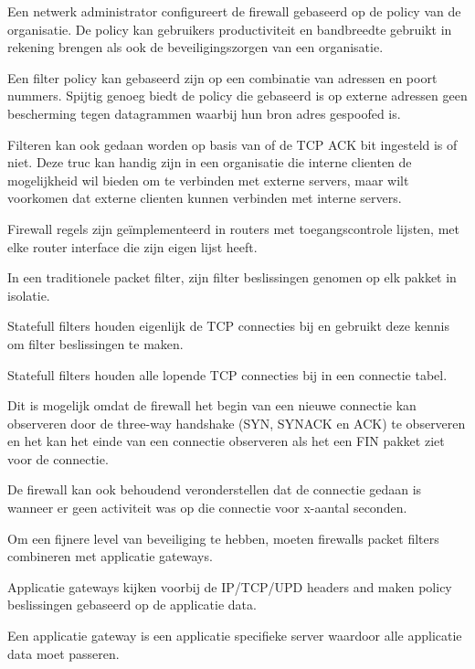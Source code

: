 \noindent Een netwerk administrator configureert de firewall gebaseerd op de policy van de organisatie. De policy kan gebruikers productiviteit en bandbreedte gebruikt in rekening brengen als ook de beveiligingszorgen van een organisatie. 

\noindent Een filter policy kan gebaseerd zijn op een combinatie van adressen en poort nummers. Spijtig genoeg biedt de policy die gebaseerd is op externe adressen geen bescherming tegen datagrammen waarbij hun bron adres gespoofed is.

\noindent Filteren kan ook gedaan worden op basis van of de TCP ACK bit ingesteld is of niet. Deze truc kan handig zijn in een organisatie die interne clienten de mogelijkheid wil bieden om te verbinden met externe servers, maar wilt voorkomen dat externe clienten kunnen verbinden met interne servers.

\noindent Firewall regels zijn geïmplementeerd in routers met toegangscontrole lijsten, met elke router interface die zijn eigen lijst heeft.


\noindent In een traditionele packet filter, zijn filter beslissingen genomen op elk pakket in isolatie. 

\noindent Statefull filters houden eigenlijk de TCP connecties bij en gebruikt deze kennis om filter beslissingen te maken.

\noindent Statefull filters houden alle lopende TCP connecties bij in een connectie tabel. 

\noindent Dit is mogelijk omdat de firewall het begin van een nieuwe connectie kan observeren door de three-way handshake (SYN, SYNACK en ACK) te observeren en het kan het einde van een connectie observeren als het een FIN pakket ziet voor de connectie. 

\noindent De firewall kan ook behoudend veronderstellen dat de connectie gedaan is wanneer er geen activiteit was op die connectie voor x-aantal seconden.


\noindent Om een fijnere level van beveiliging te hebben, moeten firewalls packet filters combineren met applicatie gateways.

\noindent Applicatie gateways kijken voorbij de IP/TCP/UPD headers and maken policy beslissingen gebaseerd op de applicatie data.

\noindent Een applicatie gateway is een applicatie specifieke server waardoor alle applicatie data moet passeren. 

